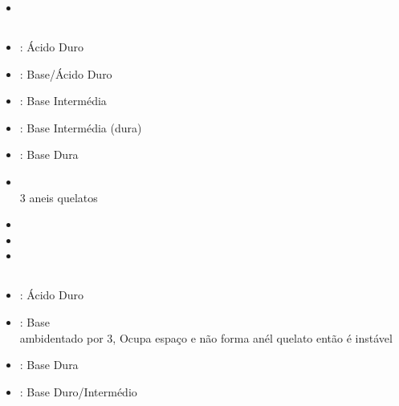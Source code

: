 \documentclass[12pt]{article}
\begin{document}
\vspace{2mm}

\begin{itemize}
	
	\item {}
	
\end{itemize}

\break

\subsection{}
\begin{itemize}
	
	\item {}: Ácido Duro
	\item {}:	Base/Ácido Duro
	\item {}:	Base Intermédia
	\item {}:		Base Intermédia (dura)
	\item {}:	Base Dura
	
\end{itemize}

\vspace{2mm}

\begin{itemize}
	
	\item {}\\
		3 aneis quelatos
		
	\item {}
	
	\item {}
	
	\item {}
	
\end{itemize}

\break

\subsection{}
\begin{itemize}
	
	\item {}: Ácido Duro
	\item {}:		Base\\
		ambidentado por 3, Ocupa espaço e não forma anél quelato então é instável
	\item {}:	Base Dura
	\item {}:	Base Duro/Intermédio
	
\end{itemize}
\end{document}
